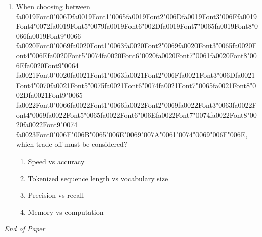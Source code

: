 \documentclass[12pt]{article}
\begin{document}
\begin{enumerate}[label=Q\arabic*.]
\begin{enumerate}[label=(\Alph*)]
    \item It ignores entity boundaries
\end{enumerate}
\item When choosing between {\csname fa0019Font0\endcsname\char"006D}{\csname fa0019Font1\endcsname\char"0065}{\csname fa0019Font2\endcsname\char"006D}{\csname fa0019Font3\endcsname\char"006F}{\csname fa0019Font4\endcsname\char"0072}{\csname fa0019Font5\endcsname\char"0079}{\csname fa0019Font6\endcsname\char"002D}{\csname fa0019Font7\endcsname\char"0065}{\csname fa0019Font8\endcsname\char"0066}{\csname fa0019Font9\endcsname\char"0066} {\csname fa0020Font0\endcsname\char"0069}{\csname fa0020Font1\endcsname\char"0063}{\csname fa0020Font2\endcsname\char"0069}{\csname fa0020Font3\endcsname\char"0065}{\csname fa0020Font4\endcsname\char"006E}{\csname fa0020Font5\endcsname\char"0074}{\csname fa0020Font6\endcsname\char"0020}{\csname fa0020Font7\endcsname\char"0061}{\csname fa0020Font8\endcsname\char"006E}{\csname fa0020Font9\endcsname\char"0064} {\csname fa0021Font0\endcsname\char"0020}{\csname fa0021Font1\endcsname\char"0063}{\csname fa0021Font2\endcsname\char"006F}{\csname fa0021Font3\endcsname\char"006D}{\csname fa0021Font4\endcsname\char"0070}{\csname fa0021Font5\endcsname\char"0075}{\csname fa0021Font6\endcsname\char"0074}{\csname fa0021Font7\endcsname\char"0065}{\csname fa0021Font8\endcsname\char"002D}{\csname fa0021Font9\endcsname\char"0065} {\csname fa0022Font0\endcsname\char"0066}{\csname fa0022Font1\endcsname\char"0066}{\csname fa0022Font2\endcsname\char"0069}{\csname fa0022Font3\endcsname\char"0063}{\csname fa0022Font4\endcsname\char"0069}{\csname fa0022Font5\endcsname\char"0065}{\csname fa0022Font6\endcsname\char"006E}{\csname fa0022Font7\endcsname\char"0074}{\csname fa0022Font8\endcsname\char"0020}{\csname fa0022Font9\endcsname\char"0074} {\csname fa0023Font0\endcsname\char"006F}{\char"006B}{\char"0065}{\char"006E}{\char"0069}{\char"007A}{\char"0061}{\char"0074}{\char"0069}{\char"006F}{\char"006E}, which trade-off must be considered?
\begin{enumerate}[label=(\Alph*)]
    \item Speed vs accuracy
    \item Tokenized sequence length vs vocabulary size
    \item Precision vs recall
    \item Memory vs computation
\end{enumerate}
\end{enumerate}

\vfill
\noindent\textit{End of Paper}
\end{document}
